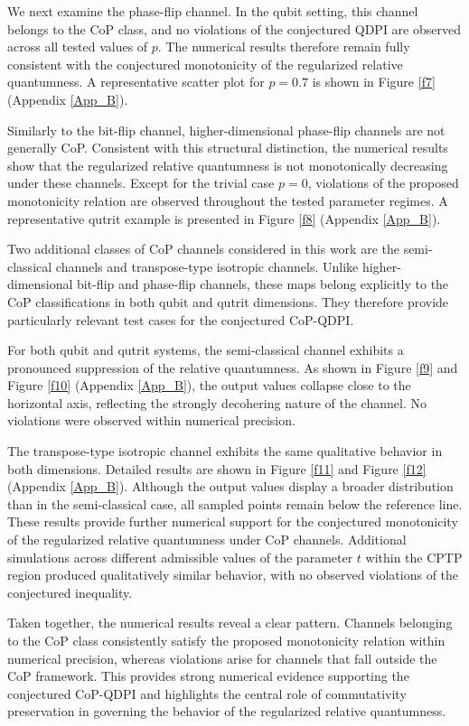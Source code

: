 \documentclass[a4paper, amsfonts, amssymb, amsmath, reprint, showkeys, nofootinbib, twoside, aps, pra]{revtex4-2}
\theoremstyle{definition}
\begin{document}
We next examine the phase-flip channel. In the qubit setting, this channel belongs to the CoP class, and no violations of the conjectured QDPI are observed across all tested values of $p$. The numerical results therefore remain fully consistent with the conjectured monotonicity of the regularized relative quantumness. A representative scatter plot for $p=0.7$ is shown in Figure \ref{f7} (Appendix \ref{App_B}).

Similarly to the bit-flip channel, higher-dimensional phase-flip channels are not generally CoP. Consistent with this structural distinction, the numerical results show that the regularized relative quantumness is not monotonically decreasing under these channels. Except for the trivial case $p=0$, violations of the proposed monotonicity relation are observed throughout the tested parameter regimes. A representative qutrit example is presented in Figure \ref{f8} (Appendix \ref{App_B}).

Two additional classes of CoP channels considered in this work are the semi-classical channels and transpose-type isotropic channels. Unlike higher-dimensional bit-flip and phase-flip channels, these maps belong explicitly to the CoP classifications in both qubit and qutrit dimensions. They therefore provide particularly relevant test cases for the conjectured CoP-QDPI.

For both qubit and qutrit systems, the semi-classical channel exhibits a pronounced suppression of the relative quantumness. As shown in Figure \ref{f9} and Figure \ref{f10} (Appendix \ref{App_B}), the output values collapse close to the horizontal axis, reflecting the strongly decohering nature of the channel. No violations were observed within numerical precision.

The transpose-type isotropic channel exhibits the same qualitative behavior in both dimensions. Detailed results are shown in Figure \ref{f11} and Figure \ref{f12} (Appendix \ref{App_B}). Although the output values display a broader distribution than in the semi-classical case, all sampled points remain below the reference line. These results provide further numerical support for the conjectured monotonicity of the regularized relative quantumness under CoP channels. Additional simulations across different admissible values of the parameter $t$ within the CPTP region produced qualitatively similar behavior, with no observed violations of the conjectured inequality.

Taken together, the numerical results reveal a clear pattern. Channels belonging to the CoP class consistently satisfy the proposed monotonicity relation within numerical precision, whereas violations arise for channels that fall outside the CoP framework. This provides strong numerical evidence supporting the conjectured CoP-QDPI and highlights the central role of commutativity preservation in governing the behavior of the regularized relative quantumness.
\end{document}
